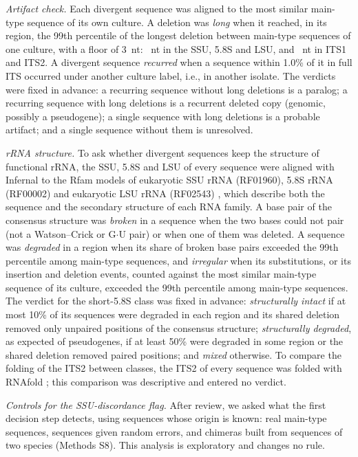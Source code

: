 \documentclass[11pt]{article}
\begin{document}
\emph{Artifact check.} Each divergent sequence was aligned to the most similar main-type sequence of its own
culture. A deletion was \emph{long} when it reached, in its region, the 99th percentile of the longest deletion
between main-type sequences of one culture, with a floor of 3~nt: \ArtLConserved{}~nt in the SSU, 5.8S and LSU, and
\ArtLSpacer{}~nt in ITS1 and ITS2. A divergent sequence \emph{recurred} when a sequence within 1.0\% of it in full
ITS occurred under another culture label, i.e., in another isolate. The verdicts were fixed in advance: a recurring
sequence without long deletions is a paralog; a recurring sequence with long deletions is a recurrent deleted copy
(genomic, possibly a pseudogene); a single sequence with long deletions is a probable artifact; and a single
sequence without them is unresolved.

\emph{rRNA structure.} To ask whether divergent sequences keep the structure of functional rRNA, the SSU, 5.8S
and LSU of every sequence were aligned with Infernal \cite{nawrocki2013infernal} to the Rfam models of eukaryotic SSU
rRNA (RF01960), 5.8S rRNA (RF00002) and eukaryotic LSU rRNA (RF02543) \cite{ontiverospalacios2025rfam}, which
describe both the sequence and the secondary structure of each RNA family. A base pair of the consensus structure
was \emph{broken} in a sequence when the two bases could not pair (not a Watson--Crick or G$\cdot$U pair) or when
one of them was deleted. A sequence was \emph{degraded} in a region when its share of broken base pairs exceeded the
99th percentile among main-type sequences, and \emph{irregular} when its substitutions, or its insertion and
deletion events, counted against the most similar main-type sequence of its culture, exceeded the 99th percentile
among main-type sequences. The verdict for the short-5.8S class was fixed in advance: \emph{structurally intact} if
at most 10\% of its sequences were degraded in each region and its shared deletion removed only unpaired positions
of the consensus structure; \emph{structurally degraded}, as expected of pseudogenes, if at least 50\% were
degraded in some region or the shared deletion removed paired positions; and \emph{mixed} otherwise. To compare the
folding of the ITS2 between classes, the ITS2 of every sequence was folded with RNAfold \cite{lorenz2011viennarna};
this comparison was descriptive and entered no verdict.

\emph{Controls for the SSU-discordance flag.} After review, we asked what the first decision step detects, using
sequences whose origin is known: real main-type sequences, sequences given random errors, and chimeras built from
sequences of two species (Methods S8). This analysis is exploratory and changes no rule.
\end{document}
